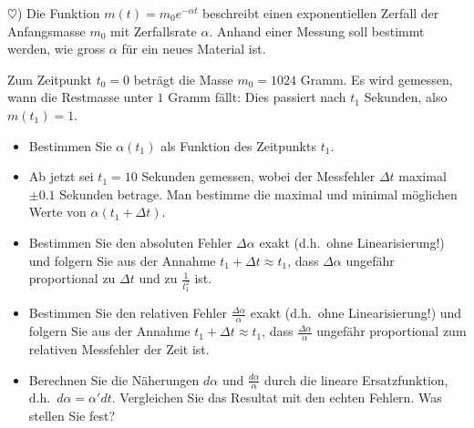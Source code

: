 \documentclass[12pt]{article}
\newenvironment{question}[2][\textcolor{red}{Aufgabe}]{\begin{trivlist}
        \item[\hskip \labelsep {\bfseries \textcolor{red}{#1}}\hskip \labelsep {\bfseries \textcolor{red}{#2}.}]}{\end{trivlist}}
\begin{document}
\begin{question}{3} ($\heartsuit$) Die Funktion $m(t) = m_0e^{-\alpha{}t}$ beschreibt einen exponentiellen Zerfall der Anfangsmasse
    $m_0$ mit Zerfallsrate $\alpha$. Anhand einer Messung soll bestimmt werden, wie gross $\alpha$ für ein neues
    Material ist.

    Zum Zeitpunkt $t_0 = 0$ beträgt die Masse $m_0 = 1024$ Gramm. Es wird gemessen,
    wann die Restmasse unter $1$ Gramm fällt: Dies passiert nach $t_1$ Sekunden,
    also $m(t_1) = 1$.
    \begin{itemize}
        \item[(a)] Bestimmen Sie $\alpha(t_1)$ als Funktion des Zeitpunkts $t_1$.
        \item[(b)] Ab jetzt sei $t_1 = 10$ Sekunden gemessen, wobei der Messfehler $\Delta{t}$
              maximal $\pm0.1$ Sekunden betrage. Man bestimme die maximal und minimal
              möglichen Werte von $\alpha(t_1 + \Delta{}t)$.
        \item[(c)] Bestimmen Sie den absoluten Fehler $\Delta\alpha$ exakt (d.h.\ ohne Linearisierung!) und
              folgern Sie aus der Annahme $t_1 + \Delta{}t \approx t_1$, dass $\Delta\alpha$
              ungefähr proportional zu $\Delta{t}$ und zu $\frac{1}{t_1^2}$ ist.
        \item[(d)] Bestimmen Sie den relativen Fehler $\frac{\Delta\alpha}{\alpha}$ exakt (d.h.\ ohne Linearisierung!) und folgern Sie aus der Annahme
              $t_1 + \Delta{t} \approx t_1$, dass $\frac{\Delta\alpha}{\alpha}$ ungefähr proportional zum relativen Messfehler
              der Zeit ist.
        \item[(e)] Berechnen Sie die Näherungen $d\alpha$ und $\frac{d\alpha}{\alpha}$ durch die lineare Ersatzfunktion, d.h.\ $d\alpha = \alpha'dt$.
              Vergleichen Sie das Resultat mit den echten Fehlern. Was stellen Sie fest?
    \end{itemize}
\end{question}
\end{document}

